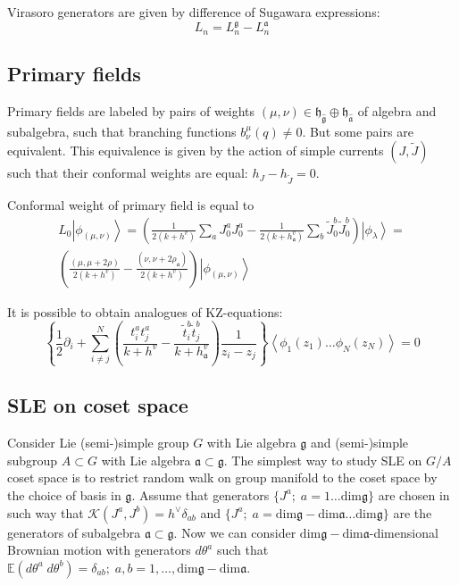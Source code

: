 \documentclass[12pt]{article}
\theoremstyle{definition}
\newcommand{\gf}{\mathfrak{g}}
\newcommand{\af}{\mathfrak{a}}
\newcommand{\hf}{\mathfrak{h}}
\newcommand{\gfh}{\hat{\mathfrak{g}}}
\newcommand{\afh}{\hat{\mathfrak{a}}}
\theoremstyle{definition} \newtheorem{Def}{Definition}
\begin{document}
Virasoro generators are given by difference of Sugawara expressions:
\begin{equation*}
  L_{n}=L_{n}^{\gf}-L_{n}^{\af}
\end{equation*}

\subsection{Primary fields}
\label{sec:primary-fields}
Primary fields are labeled by pairs of weights $(\mu,\nu)\in \hf_{\gfh}\oplus \hf_{\afh}$  of algebra and subalgebra, such that branching functions $b^{\mu}_{\nu}(q)\neq 0$. But some pairs are equivalent. This equivalence is given by the action of simple currents $(J,\tilde{J})$ such that their conformal weights are equal:  $h_{J}-h_{\tilde{J}}=0$. 

Conformal weight of primary field is equal to
\begin{multline}
  L_0\left|\phi_{(\mu,\nu)}\right>=\left(\frac{1}{2(k+h^v)}\sum_aJ^a_0J^a_0-\frac{1}{2(k+h_{\af}^v)}\sum_b \tilde{J}^b_0 \tilde{J}^b_0 \right)
  \left|\phi_{\lambda}\right>=\\
  \left(\frac{(\mu,\mu+2\rho)}{2(k+h^v)}-\frac{(\nu,\nu+2\rho_{\af})}{2(k+h^v)}\right)\left|\phi_{(\mu,\nu)}\right>
\end{multline}


It is possible to obtain analogues of KZ-equations:
\begin{equation*}
  \left\{\frac{1}{2}\partial_{i} + \sum_{i\neq j}^{N}\left(\frac{t^{a}_{i}t^{a}_{j}}{k+h^{v}}-\frac{\tilde t^{b}_{i}\tilde t^{b}_{j}}{k+h^{v}_{\af}}\right)\frac{1}{z_{i}-z_{j}}\right\} \left<\phi_{1}(z_{1})\dots \phi_{N}(z_{N})\right>=0
\end{equation*}

\subsection{SLE on coset space}
\label{sec:sle-coset-space}

Consider Lie (semi-)simple group $G$ with Lie algebra $\gf$ and (semi-)simple subgroup $A\subset G$ with Lie algebra $\af\subset \gf$. 
The simplest way to study SLE on $G/A$ coset space is to restrict random walk on group manifold to the coset space by the choice of basis in $\gf$. Assume that generators $\{J^{a};\; a=1\dots \mathrm{dim}\gf\}$ are chosen in such way that $\mathcal{K}(J^{a},J^{b})=h^{\vee}\delta_{ab}$ and $\{J^{a};\; a=\mathrm{dim}\gf-\mathrm{dim}\af\dots \mathrm{dim}\gf\}$ are the generators of subalgebra $\af\subset \gf$. Now we can consider $\mathrm{dim}\gf-\mathrm{dim}\af$-dimensional Brownian motion with generators $d\theta^{a}$ such that $\mathbb{E}(d\theta^{a} \; d\theta^{b})=\delta_{ab};\; a,b=1,\dots,\mathrm{dim}\gf-\mathrm{dim}\af$.
\end{document}
